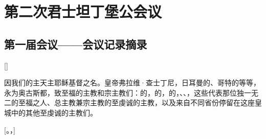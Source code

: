 
\chapter{第二次君士坦丁堡公会议}



\section{第一届会议——会议记录摘录}

[]\par

因我们的主天主耶稣基督之名。皇帝弗拉维·查士丁尼，日耳曼的、哥特的等等，永为奥古斯都，致至福的主教和宗主教们：的，的，的，、、，这些代表那位独一无二的至福之人、总主教兼宗主教的至虔诚的主教，以及来自不同省份停留在这座皇城中的其他至虔诚的主教们。\par

[。，]\par

